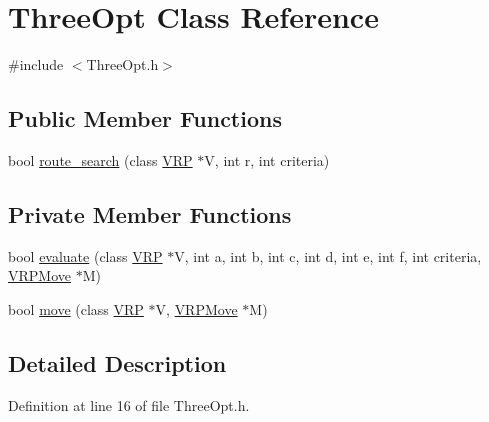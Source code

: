 \hypertarget{class_three_opt}{
\section{ThreeOpt Class Reference}
\label{class_three_opt}
}


{\ttfamily \#include $<$ThreeOpt.h$>$}

\subsection*{Public Member Functions}
\begin{DoxyCompactItemize}
\item 
bool \hyperlink{class_three_opt_a353cc9c135c88d7d3f4441a0e542ff1c}{route\_\-search} (class \hyperlink{class_v_r_p}{VRP} $\ast$V, int r, int criteria)
\end{DoxyCompactItemize}
\subsection*{Private Member Functions}
\begin{DoxyCompactItemize}
\item 
bool \hyperlink{class_three_opt_a24a9fd729107903e4078f03e255dbeba}{evaluate} (class \hyperlink{class_v_r_p}{VRP} $\ast$V, int a, int b, int c, int d, int e, int f, int criteria, \hyperlink{class_v_r_p_move}{VRPMove} $\ast$M)
\item 
bool \hyperlink{class_three_opt_a27126f3cba7603f1f37d7ce20ecd081c}{move} (class \hyperlink{class_v_r_p}{VRP} $\ast$V, \hyperlink{class_v_r_p_move}{VRPMove} $\ast$M)
\end{DoxyCompactItemize}


\subsection{Detailed Description}


Definition at line 16 of file ThreeOpt.h.



